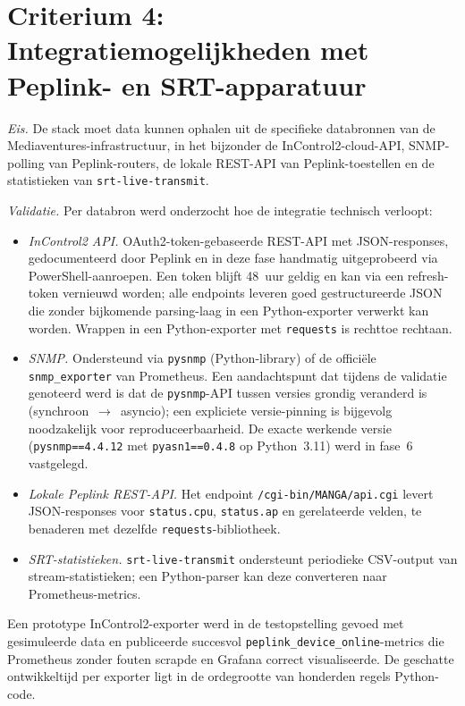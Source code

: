 \section*{Criterium 4: Integratiemogelijkheden met Peplink- en SRT-apparatuur}

\emph{Eis.} De stack moet data kunnen ophalen uit de specifieke databronnen van de Mediaventures-infrastructuur, in het bijzonder de InControl2-cloud-API, SNMP-polling van Peplink-routers, de lokale REST-API van Peplink-toestellen en de statistieken van \texttt{srt-live-transmit}.

\emph{Validatie.} Per databron werd onderzocht hoe de integratie technisch verloopt:

\begin{itemize}
  \item \emph{InControl2 API.} OAuth2-token-gebaseerde REST-API met JSON-responses, gedocumenteerd door Peplink en in deze fase handmatig uitgeprobeerd via PowerShell-aanroepen. Een token blijft 48~uur geldig en kan via een refresh-token vernieuwd worden; alle endpoints leveren goed gestructureerde JSON die zonder bijkomende parsing-laag in een Python-exporter verwerkt kan worden. Wrappen in een Python-exporter met \texttt{requests} is rechttoe rechtaan.
  \item \emph{SNMP.} Ondersteund via \texttt{pysnmp} (Python-library) of de officiële \texttt{snmp\_exporter} van Prometheus. Een aandachtspunt dat tijdens de validatie genoteerd werd is dat de \texttt{pysnmp}-API tussen versies grondig veranderd is (synchroon~$\rightarrow$~asyncio); een expliciete versie-pinning is bijgevolg noodzakelijk voor reproduceerbaarheid. De exacte werkende versie (\texttt{pysnmp==4.4.12} met \texttt{pyasn1==0.4.8} op Python~3.11) werd in fase~6 vastgelegd.
  \item \emph{Lokale Peplink REST-API.} Het endpoint \texttt{/cgi-bin/MANGA/api.cgi} levert JSON-responses voor \texttt{status.cpu}, \texttt{status.ap} en gerelateerde velden, te benaderen met dezelfde \texttt{requests}-bibliotheek.
  \item \emph{SRT-statistieken.} \texttt{srt-live-transmit} ondersteunt periodieke CSV-output van stream-statistieken; een Python-parser kan deze converteren naar Prometheus-metrics.
\end{itemize}

Een prototype InControl2-exporter werd in de testopstelling gevoed met gesimuleerde data en publiceerde succesvol \texttt{peplink\_device\_online}-metrics die Prometheus zonder fouten scrapde en Grafana correct visualiseerde. De geschatte ontwikkeltijd per exporter ligt in de ordegrootte van honderden regels Python-code.

